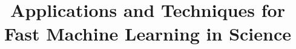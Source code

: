 \documentclass[utf8]{frontiersFPHY}
\begin{document}
\title[Fast Machine Learning in Science]{Applications and Techniques for Fast Machine Learning in Science}

\onecolumn

\author[\firstAuthorLast ]{\Authors} %
\address{} %
\correspondance{} %

\extraAuth{}%

\maketitle

\clearpage
\begin{spacing}{1.3}
\makeatletter
  \null\hfill\textbf{\Large\contentsname}\hfill\null\par
  \@mkboth{\MakeUppercase\contentsname}{\MakeUppercase\contentsname}%
\makeatother
\end{spacing}
\end{document}
